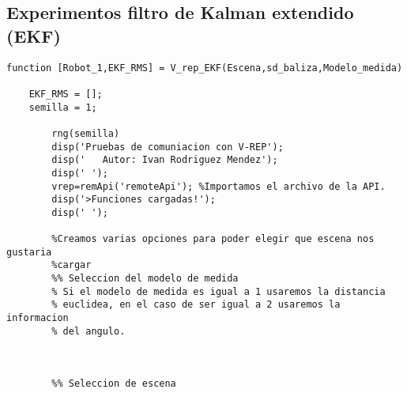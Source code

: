 \subsection{Experimentos filtro de Kalman extendido (EKF)}
\begin{lstlisting}[frame=single]
function [Robot_1,EKF_RMS] = V_rep_EKF(Escena,sd_baliza,Modelo_medida)
    
    EKF_RMS = [];
    semilla = 1;
    
        rng(semilla)
        disp('Pruebas de comuniacion con V-REP');
        disp('   Autor: Ivan Rodriguez Mendez');
        disp(' ');
        vrep=remApi('remoteApi'); %Importamos el archivo de la API.
        disp('>Funciones cargadas!');
        disp(' ');
        
        %Creamos varias opciones para poder elegir que escena nos gustaria
        %cargar
        %% Seleccion del modelo de medida
        % Si el modelo de medida es igual a 1 usaremos la distancia
        % euclidea, en el caso de ser igual a 2 usaremos la informacion
        % del angulo.
        
        
        
        %% Seleccion de escena
        

\end{lstlisting}
